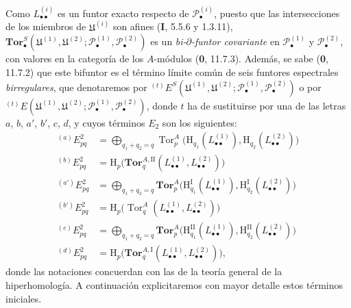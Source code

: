 \begin{env}[6.6.2]
Como $L_{\bullet\bullet}^{(i)}$ es un funtor exacto respecto de
$\mathscr P_\bullet^{(i)}$, puesto que las intersecciones de los miembros
de $\mathfrak U^{(i)}$ son afines (\textbf I, 5.5.6 y 1.3.11),
$\mathbf{Tor}_\bullet^S
(\mathfrak U^{(1)},\mathfrak U^{(2)};
 \mathscr P_\bullet^{(1)},\mathscr P_\bullet^{(2)})$ es un
\emph{bi-$\partial$-funtor covariante} en $\mathscr P_\bullet^{(1)}$ y
$\mathscr P_\bullet^{(2)}$, con valores en la categoría de los $A$-módulos
(\textbf{0}, 11.7.3). Además, se sabe (\textbf{0}, 11.7.2) que este
bifuntor es el término límite común de seis funtores espectrales \emph{birregulares},
que denotaremos por
${}^{(t)}E^S
(\mathfrak U^{(1)},\mathfrak U^{(2)};
\mathscr P_\bullet^{(1)},\mathscr P_\bullet^{(2)})$
o por
${}^{(t)}E
(\mathfrak U^{(1)},\mathfrak U^{(2)};
\mathscr P_\bullet^{(1)},\mathscr P_\bullet^{(2)})$,
donde $t$ ha de sustituirse por una de las letras $a$, $b$, $a'$, $b'$, $c$,
$d$, y cuyos términos $E_2$ son los siguientes:
\[
\begin{aligned}
  {}^{(a)}E_{pq}^2
  &=\bigoplus_{q_1+q_2=q}
    \operatorname{Tor}_p^A
    \bigl(\mathrm H_{q_1}(L_{\bullet\bullet}^{(1)}),
          \mathrm H_{q_2}(L_{\bullet\bullet}^{(2)})\bigr)\\
  {}^{(b)}E_{pq}^2
  &=\mathrm H_p\bigl(
    \mathbf{Tor}_q^{A,\mathrm{II}}
    (L_{\bullet\bullet}^{(1)},L_{\bullet\bullet}^{(2)})\bigr)\\
  {}^{(a')}E_{pq}^2
  &=\bigoplus_{q_1+q_2=q}
    \mathbf{Tor}_p^A
    \bigl(\mathrm H_{q_1}^{\mathrm I}(L_{\bullet\bullet}^{(1)}),
          \mathrm H_{q_2}^{\mathrm I}(L_{\bullet\bullet}^{(2)})\bigr)\\
  {}^{(b')}E_{pq}^2
  &=\mathrm H_p\bigl(
    \operatorname{Tor}_q^A
    (L_{\bullet\bullet}^{(1)},L_{\bullet\bullet}^{(2)})\bigr)\\
  {}^{(c)}E_{pq}^2
  &=\bigoplus_{q_1+q_2=q}
    \mathbf{Tor}_p^A
    \bigl(\mathrm H_{q_1}^{\mathrm{II}}(L_{\bullet\bullet}^{(1)}),
          \mathrm H_{q_2}^{\mathrm{II}}(L_{\bullet\bullet}^{(2)})\bigr)\\
  {}^{(d)}E_{pq}^2
  &=\mathrm H_p\bigl(
    \mathbf{Tor}_q^{A,\mathrm I}
    (L_{\bullet\bullet}^{(1)},L_{\bullet\bullet}^{(2)})\bigr),
\end{aligned}
\]
donde las notaciones concuerdan con las de la teoría general de la
hiperhomología. A continuación explicitaremos con mayor detalle estos términos
iniciales.
\end{env}

